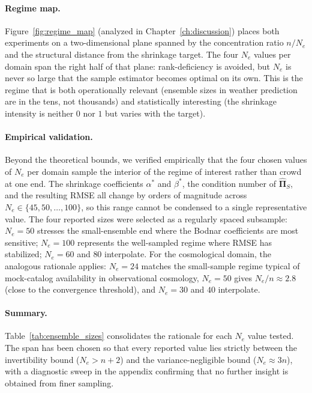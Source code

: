 \paragraph{Regime map.}
Figure~\ref{fig:regime_map} (analyzed in Chapter~\ref{ch:discussion}) places both experiments on a two-dimensional plane spanned by the concentration ratio $n/N_e$ and the structural distance from the shrinkage target. The four $N_e$ values per domain span the right half of that plane: rank-deficiency is avoided, but $N_e$ is never so large that the sample estimator becomes optimal on its own. This is the regime that is both operationally relevant (ensemble sizes in weather prediction are in the tens, not thousands) and statistically interesting (the shrinkage intensity is neither $0$ nor $1$ but varies with the target).

\paragraph{Empirical validation.}
Beyond the theoretical bounds, we verified empirically that the four chosen values of $N_e$ per domain sample the interior of the regime of interest rather than crowd at one end. The shrinkage coefficients $\alpha^*$ and $\beta^*$, the condition number of $\hat{\boldsymbol{\Pi}}_S$, and the resulting RMSE all change by orders of magnitude across $N_e \in \{45, 50, \ldots, 100\}$, so this range cannot be condensed to a single representative value. The four reported sizes were selected as a regularly spaced subsample: $N_e = 50$ stresses the small-ensemble end where the Bodnar coefficients are most sensitive; $N_e = 100$ represents the well-sampled regime where RMSE has stabilized; $N_e = 60$ and $80$ interpolate. For the cosmological domain, the analogous rationale applies: $N_e = 24$ matches the small-sample regime typical of mock-catalog availability in observational cosmology, $N_e = 50$ gives $N_e/n \approx 2.8$ (close to the convergence threshold), and $N_e = 30$ and $40$ interpolate.

\paragraph{Summary.}
Table~\ref{tab:ensemble_sizes} consolidates the rationale for each $N_e$ value tested. The span has been chosen so that every reported value lies strictly between the invertibility bound ($N_e > n + 2$) and the variance-negligible bound ($N_e \approx 3n$), with a diagnostic sweep in the appendix confirming that no further insight is obtained from finer sampling.

